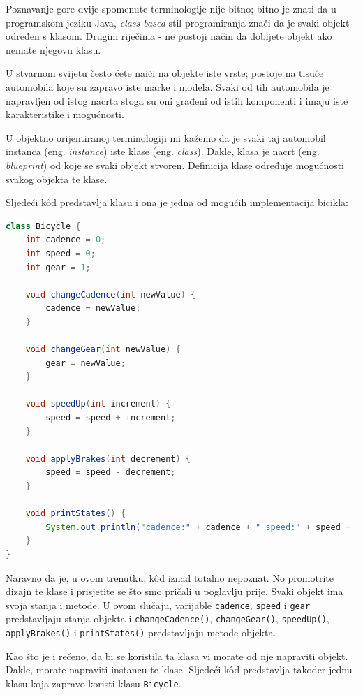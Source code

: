 Poznavanje gore dvije spomenute terminologije nije bitno; bitno je znati da u programskom jeziku Java, \emph{class-based} stil programiranja znači da je svaki objekt određen s klasom. Drugim riječima - ne postoji način da dobijete objekt ako nemate njegovu klasu.

U stvarnom svijetu često ćete naići na objekte iste vrste; postoje na tisuće automobila koje su zapravo iste marke i modela. Svaki od tih automobila je napravljen od istog nacrta stoga su oni građeni od istih komponenti i imaju iste karakteristike i mogućnosti.

U objektno orijentiranoj terminologiji mi kažemo da je svaki taj automobil instanca (eng. \emph{instance}) iste klase (eng. \emph{class}). Dakle, klasa je nacrt (eng. \emph{blueprint}) od koje se svaki objekt stvoren. Definicija klase određuje mogućnosti svakog objekta te klase.

Sljedeći kôd predstavlja klasu i ona je jedna od mogućih implementacija bicikla:~\cite{javatutorials}

\begin{lstlisting}[language=java, caption=Bicycle]
class Bicycle {
    int cadence = 0;
    int speed = 0;
    int gear = 1;
    
    void changeCadence(int newValue) {
        cadence = newValue;
    }
    
    void changeGear(int newValue) {
        gear = newValue;
    }
    
    void speedUp(int increment) {
        speed = speed + increment;
    }
    
    void applyBrakes(int decrement) {
        speed = speed - decrement;
    }
    
    void printStates() {
        System.out.println("cadence:" + cadence + " speed:" + speed + " gear:" + gear);
    }
}
\end{lstlisting}

Naravno da je, u ovom trenutku, kôd iznad totalno nepoznat. No promotrite dizajn te klase i prisjetite se što smo pričali u poglavlju prije. Svaki objekt ima svoja stanja i metode. U ovom slučaju, varijable \texttt{cadence}, \texttt{speed} i \texttt{gear} predstavljaju stanja objekta i \texttt{changeCadence()}, \texttt{changeGear()}, \texttt{speedUp()}, \texttt{applyBrakes()} i \texttt{printStates()} predstavljaju metode objekta.

Kao što je i rečeno, da bi se koristila ta klasa vi morate od nje napraviti objekt. Dakle, morate napraviti instancu te klase. Sljedeći kôd predstavlja također jednu klasu koja zapravo koristi klasu \texttt{Bicycle}.~\cite{javatutorials}

